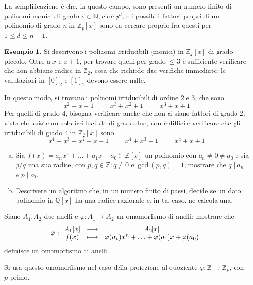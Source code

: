 \documentclass[11pt, a4paper]{scrartcl}
\theoremstyle{definition}
\newtheorem{esempio}{Esempio}
\numberwithin{esempio}{section}
\theoremstyle{definition}
\numberwithin{obs}{section}
\numberwithin{nota}{section}
\numberwithin{equation}{subsection}
\begin{document}
La semplificazione \`e che, in questo campo, sono presenti un numero finito di polinomi monici di grado $d \in \mathbb{N}$, cio\`e $p^d$, e i possibili fattori propri di un polinomio di grado $n$ in $\mathbb{Z}_p[x]$ sono da cercare proprio fra questi per $1 \le d \le n-1$.
\begin{esempio}
	Si descrivono i polinomi irriducibili (monici) in $\mathbb{Z}_2[x]$ di grado piccolo. 
	Oltre a $x$ e $x+1$, per trovare quelli per grado $\le 3$ \`e sufficiente verificare che non abbiano radice in $\mathbb{Z}_2$, cosa che richiede due verifiche immediate: le valutazioni in $[0]_2$ e $[1]_2$ devono essere nulle.

	In questo modo, si trovano i polinomi irriducibili di ordine $2$ e $3$, che sono 
	\[
	x^2 + x + 1 \hspace{1cm} x^3 + x^2 + 1 \hspace{1cm} x^3 + x +1
	\] 
	Per quelli di grado $4$, bisogna verificare anche che non ci siano fattori di grado $2$; visto che esiste un solo irriducibile di grado due, non \`e difficile verificare che gli irriducibili di grado $4$ in $\mathbb{Z}_2 [x]$ sono
	\[
	x^4 + x^3 + x^2 + x +1 \hspace{1cm}x^4 + x^3 +1 \hspace{1cm}x^4 + x + 1
	\] 
\end{esempio}
\begin{enumerate}[(a).]
	\item Sia $f(x) = a_n x^n + \ldots + a_1 x + a_0 \in \mathbb{Z}[x]$ un polinomio con $a_n \neq 0 \neq a_0$ e sia $ p /q$ una sua radice, con $p,q \in \mathbb{Z}:q \neq 0$ e $\operatorname{gcd}(p,q) =1$; mostrare che $q  \mid a_n$ e $p  \mid a_0$.
	\item Descrivere un algoritmo che, in un numero finito di passi, decide se un dato polinomio in $\mathbb{Q}[x]$ ha una radice razionale e, in tal caso, ne calcola una.
\end{enumerate}
\begin{prop}
	{}{}
	Siano $A_1, A_2$ due anelli e $\varphi : A_1 \to A_2$ un omomorfismo di anelli; mostrare che 
	\[
	\hat{\varphi } : 
	\begin{array}{c c c}
		A_1[x] & \longrightarrow & A_2[x]\\
		f(x)  & \longmapsto & \varphi (a_n) x^n + \ldots + \varphi (a_1) x + \varphi (a_0) 	\end{array}
	\] 
	definisce un omomorfismo di anelli.
\end{prop}
\noindent Si usa questo omomorfismo nel caso della proiezione al quoziente $\varphi :\mathbb{Z} \to \mathbb{Z}_p$, con $p$ primo.
\end{document}
